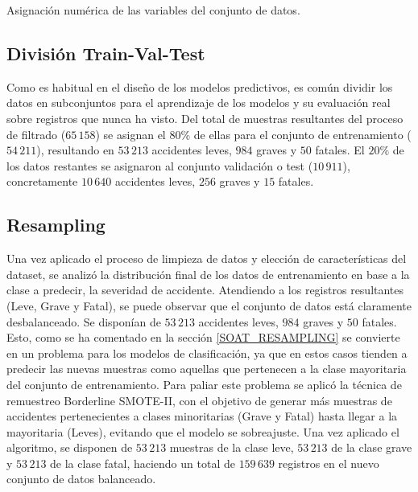 \documentclass{uathesis-es}
\begin{document}
{\begin{table}[ht]
    \caption{Asignación numérica de las variables del conjunto de datos.}
    \label{TransformacionDatosTabla}
\end{table}


\subsection*{División Train-Val-Test}


Como es habitual en el diseño de los modelos predictivos, es común dividir los datos en subconjuntos para el aprendizaje de los modelos y su evaluación real sobre registros que nunca ha visto. Del total de muestras resultantes del proceso de filtrado ($65\,158$) se asignan el 80\% de ellas para el conjunto de entrenamiento ($54\,211$), resultando en $53\,213$ accidentes leves, $984$ graves y $50$ fatales. El $20\%$ de los datos restantes se asignaron al conjunto validación o test ($10\,911$), concretamente $10\,640$ accidentes leves, $256$ graves y $15$ fatales.


\subsection*{Resampling}

Una vez aplicado el proceso de limpieza de datos y elección de características del dataset, se analizó la distribución final de los datos de entrenamiento en base a la clase a predecir, la severidad de accidente. Atendiendo a los registros resultantes (Leve, Grave y Fatal), se puede observar que el conjunto de datos está claramente desbalanceado. Se disponían de $53\,213$ accidentes leves, $984$ graves y $50$ fatales. Esto, como se ha comentado en la sección \ref{SOAT_RESAMPLING} se convierte en un problema para los modelos de clasificación, ya que en estos casos tienden a predecir las nuevas muestras como aquellas que pertenecen a la clase mayoritaria del conjunto de entrenamiento. Para paliar este problema se aplicó la técnica de remuestreo Borderline SMOTE-II, con el objetivo de generar más muestras de accidentes pertenecientes a clases minoritarias (Grave y Fatal) hasta llegar a la mayoritaria (Leves), evitando que el modelo se sobreajuste. Una vez aplicado el algoritmo, se disponen de $53\,213$ muestras de la clase leve, $53\,213$ de la clase grave y $53\,213$ de la clase fatal, haciendo un total de $159\,639$ registros en el nuevo conjunto de datos balanceado.

}
\end{document}
